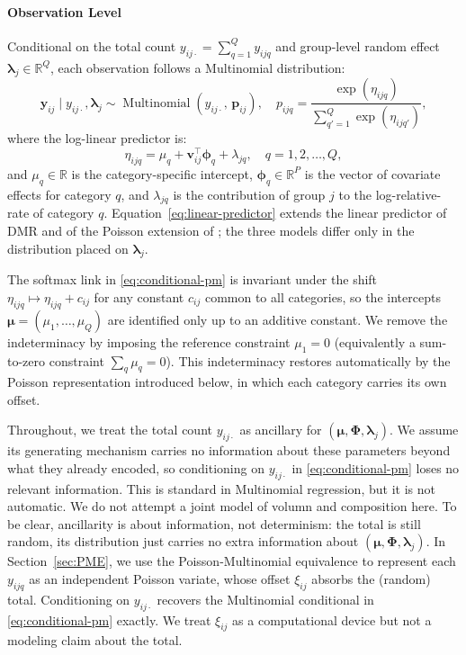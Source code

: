 \paragraph*{Observation Level}
Conditional on the total count $y_{ij\cdot}=\sum_{q=1}^{Q}y_{ijq}$ and group-level random effect $\bm{\lambda}_{j}\in \mathbb{R}^{Q}$, each observation follows a Multinomial distribution:
\begin{equation}
    \bm{y}_{ij} \mid  y_{ij\cdot} , \bm{\lambda}_{j}
    \sim \operatorname{Multinomial}\left(y_{ij\cdot},\, \bm{p}_{ij}\right), \quad p_{ijq}=\frac{\exp(\eta_{ijq})}{\sum_{q'=1}^{Q}\exp(\eta_{ijq'})},
    \label{eq:conditional-pm}
\end{equation}
where the log-linear predictor is:
\begin{equation}
    \eta_{ijq}=\mu_{q}+\bm{v}_{ij}^{\top}\bm{\phi}_{q}+
    \lambda_{jq}, \quad q=1,2,\dots, Q,
    \label{eq:linear-predictor}
\end{equation}
and $\mu_{q}\in\mathbb{R}$ is the category-specific intercept, $\bm{\phi}_{q}\in\mathbb{R}^{P}$ is the vector of covariate effects for category $q$, and $\lambda_{jq}$ is the contribution of group $j$ to the log-relative-rate of category $q$. Equation~\eqref{eq:linear-predictor} extends the linear predictor of DMR \citep{Taddy_2015} and of the Poisson extension of \citet{lee2017poissontrickextensionsfitting}; the three models differ only in the distribution placed on $\bm{\lambda}_{j}$.

The softmax link in \eqref{eq:conditional-pm} is invariant under the shift $\eta_{ijq}\mapsto\eta_{ijq}+c_{ij}$ for any constant $c_{ij}$ common to all categories, so the intercepts $\bm{\mu}=(\mu_{1},\dots,\mu_{Q})$ are identified only up to an additive constant. We remove the indeterminacy by imposing the reference constraint $\mu_{1}=0$ (equivalently a sum-to-zero constraint $\sum_{q}\mu_{q}=0$). This indeterminacy restores automatically by the Poisson representation introduced below, in which each category carries its own offset.

Throughout, we treat the total count $y_{ij\cdot}$ as ancillary for $(\bm{\mu},\bm{\Phi},\bm{\lambda}_{j})$. We assume its generating mechanism carries no information about these parameters beyond what they already encoded, so conditioning on $y_{ij\cdot}$ in \eqref{eq:conditional-pm} loses no relevant information. This is standard in Multinomial regression, but it is not automatic. We do not attempt a joint model of volumn and composition  here. To be clear, ancillarity is about information, not determinism: the total is still random, its distribution just carries no extra information about $(\bm{\mu},\bm{\Phi},\bm{\lambda}_{j})$. In Section~\ref{sec:PME}, we use the Poisson-Multinomial equivalence to represent each $y_{ijq}$ as an independent Poisson variate, whose offset $\xi_{ij}$ absorbs the (random) total. Conditioning on $y_{ij\cdot}$ recovers the Multinomial conditional in \eqref{eq:conditional-pm} exactly. We treat $\xi_{ij}$ as a computational device but not a modeling claim about the total.

